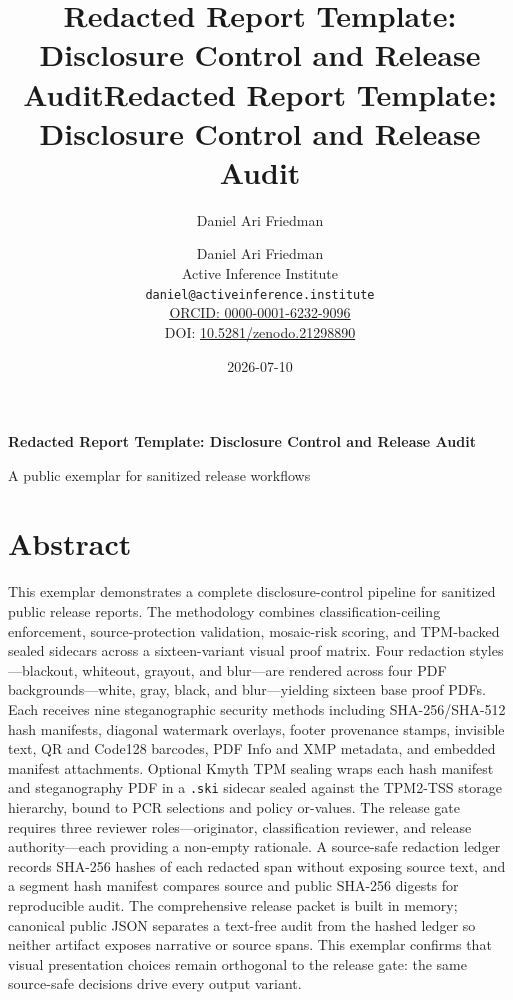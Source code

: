 \documentclass[
]{article}
\title{Redacted Report Template: Disclosure Control and Release Audit}
\author{Daniel Ari Friedman}
\date{}
\title{Redacted Report Template: Disclosure Control and Release Audit}
\author{Daniel Ari Friedman\\\footnotesize{Active Inference Institute}\\\footnotesize{\texttt{daniel@activeinference.institute}}\\\footnotesize{\href{https://orcid.org/0000-0001-6232-9096}{ORCID: 0000-0001-6232-9096}} \\ \footnotesize{DOI: \href{https://doi.org/10.5281/zenodo.21298890}{10.5281/zenodo.21298890}}}
\date{2026-07-10}
\begin{document}
\begin{titlepage}
\centering
\vspace*{2cm}
{\LARGE\bfseries Redacted Report Template: Disclosure Control and Release Audit\par}
\vspace{0.75em}
{\large A public exemplar for sanitized release workflows\par}
\vfill
\makeatletter
{\@author\par}
\vspace{1em}
{\@date\par}
\makeatother
\vfill
\end{titlepage}
\thispagestyle{empty}
\tableofcontents
\newpage

\section{Abstract}\label{abstract}

This exemplar demonstrates a complete disclosure-control pipeline for
sanitized public release reports. The methodology combines
classification-ceiling enforcement, source-protection validation,
mosaic-risk scoring, and TPM-backed sealed sidecars across a
sixteen-variant visual proof matrix. Four redaction styles---blackout,
whiteout, grayout, and blur---are rendered across four PDF
backgrounds---white, gray, black, and blur---yielding sixteen base proof
PDFs. Each receives nine steganographic security methods including
SHA-256/SHA-512 hash manifests, diagonal watermark overlays, footer
provenance stamps, invisible text, QR and Code128 barcodes, PDF Info and
XMP metadata, and embedded manifest attachments. Optional Kmyth TPM
sealing wraps each hash manifest and steganography PDF in a
\texttt{.ski} sidecar sealed against the TPM2-TSS storage hierarchy,
bound to PCR selections and policy or-values. The release gate requires
three reviewer roles---originator, classification reviewer, and release
authority---each providing a non-empty rationale. A source-safe
redaction ledger records SHA-256 hashes of each redacted span without
exposing source text, and a segment hash manifest compares source and
public SHA-256 digests for reproducible audit. The comprehensive release
packet is built in memory; canonical public JSON separates a text-free
audit from the hashed ledger so neither artifact exposes narrative or
source spans. This exemplar confirms that visual presentation choices
remain orthogonal to the release gate: the same source-safe decisions
drive every output variant.
\end{document}
